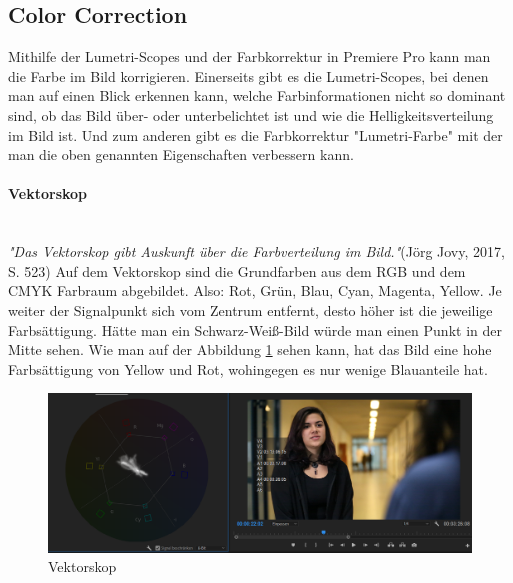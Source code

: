 \subsection{Color Correction}
Mithilfe der Lumetri-Scopes und der Farbkorrektur in Premiere Pro kann man die Farbe im Bild korrigieren. Einerseits gibt es die Lumetri-Scopes, bei denen man auf einen Blick erkennen kann, welche Farbinformationen nicht so dominant sind, ob das Bild über- oder unterbelichtet ist und wie die Helligkeitsverteilung im Bild ist. Und zum anderen gibt es die Farbkorrektur "Lumetri-Farbe" mit der man die oben genannten Eigenschaften verbessern kann.\citep{cc}
\paragraph{Vektorskop}
\leavevmode \\
\textit{"Das Vektorskop gibt Auskunft über die Farbverteilung im Bild."}(Jörg Jovy, 2017, S. 523) Auf dem Vektorskop sind die Grundfarben aus dem RGB und dem CMYK Farbraum abgebildet. Also: Rot, Grün, Blau, Cyan, Magenta, Yellow. Je weiter der Signalpunkt sich vom Zentrum entfernt, desto höher ist die jeweilige Farbsättigung. Hätte man ein Schwarz-Weiß-Bild würde man einen Punkt in der Mitte sehen.\citep{vektorskop}\newline
Wie man auf der Abbildung \ref{fig:abb22} sehen kann, hat das Bild eine hohe Farbsättigung von Yellow und Rot, wohingegen es nur wenige Blauanteile hat.
\begin{figure}[H]
	\centering
	\includegraphics[width=1.0\textwidth]{abb22} 
	\caption{Vektorskop}\label{fig:abb22}
\end{figure}
